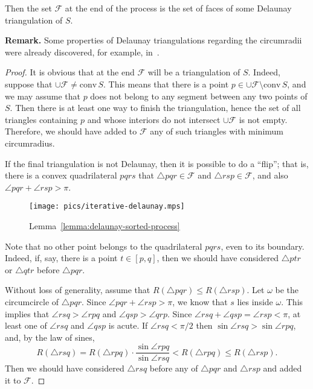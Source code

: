 \begin{appendices}
\begin{lemma}
Then the set $\mathcal{F}$ at the end of the process is the set of faces of some Delaunay triangulation of $S$.
\end{lemma}

\textbf{Remark.} Some properties of Delaunay triangulations regarding the circumradii were already discovered, for example, in~\cite{Musin1997Delaunay}.

\begin{proof}
It is obvious that at the end $\mathcal{F}$ will be a triangulation of $S$. Indeed, suppose that $\cup\mathcal{F}\neq\mathrm{conv}\,S$. This means that there is a point $p\in\cup\mathcal{F}\setminus\mathrm{conv}\,S$, and we may assume that $p$ does not belong to any segment between any two points of $S$. Then there is at least one way to finish the triangulation, hence the set of all triangles containing $p$ and whose interiors do not intersect $\cup\mathcal{F}$ is not empty. Therefore, we should have added to $\mathcal{F}$ any of such triangles with minimum circumradius.

If the final triangulation is not Delaunay, then it is possible to do a ``flip''; that is, there is a convex quadrilateral $pqrs$ that $\triangle{pqr}\in\mathcal{F}$ and $\triangle{rsp}\in\mathcal{F}$, and also $\angle{pqr} + \angle{rsp} > \pi$.

\begin{figure}[h!]
    \centering
    \texttt{[image: pics/iterative-delaunay.mps]}
    \caption{Lemma~\ref{lemma:delaunay-sorted-process}}
    \label{fig:delaunay-flip}
\end{figure}

Note that no other point belongs to the quadrilateral $pqrs$, even to its boundary. Indeed, if, say, there is a point $t\in [p, q]$, then we should have considered $\triangle ptr$ or $\triangle qtr$ before $\triangle pqr$.

Without loss of generality, assume that $R(\triangle{pqr})\leq R(\triangle{rsp})$. Let $\omega$ be the circumcircle of $\triangle{pqr}$. Since $\angle{pqr} + \angle{rsp} > \pi$, we know that $s$ lies inside $\omega$. This implies that $\angle{rsq} > \angle{rpq}$ and $\angle{qsp} > \angle{qrp}$. Since $\angle{rsq} + \angle{qsp} = \angle{rsp} < \pi$, at least one of $\angle{rsq}$ and $\angle{qsp}$ is acute. If $\angle{rsq} < \pi/2$ then $\sin\angle{rsq} > \sin\angle{rpq}$, and, by the law of sines,
$$R(\triangle{rsq}) = R(\triangle{rpq})\cdot\frac{\sin\angle{rpq}}{\sin\angle{rsq}} < R(\triangle{rpq})\leq R(\triangle{rsp}).$$
Then we should have considered $\triangle{rsq}$ before any of $\triangle{pqr}$ and $\triangle{rsp}$ and added it to $\mathcal{F}$.


\end{proof}
\end{appendices}
